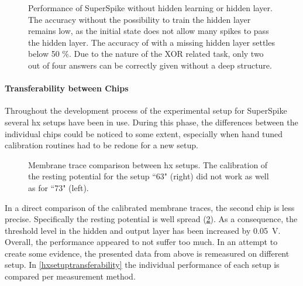 \begin{figure}[htb!]
		\centering
		
	\caption[Performance of SuperSpike without hidden learning or hidden layer.]{Performance of SuperSpike without hidden learning or hidden layer. The accuracy without the possibility to train the hidden layer remains low, as the initial state does not allow many spikes to pass the hidden layer. The accuracy of with a missing hidden layer settles below 50 \%. Due to the nature of the XOR related task, only two out of four answers can be correctly given without a deep structure.}
	\label{hiddenlearning}
\end{figure}

\paragraph{Transferability between Chips}
Throughout the development process of the experimental setup for SuperSpike several \gls{hx} setups have been in use. During this phase, the differences between the individual chips could be noticed to some extent, especially when hand tuned calibration routines had to be redone for a new setup.
\begin{figure}[b!]
	\begin{subfigure}{0.5\textwidth}
		\centering
		
	\end{subfigure}
	\begin{subfigure}{0.5\textwidth}
		\centering
		
	\end{subfigure}
	\caption[Membrane trace comparison between \gls{hx} setups.]{Membrane trace comparison between \gls{hx} setups. The calibration of the resting potential for the setup ``63" (right) did not work as well as for ``73" (left).}
	\label{hxsetupmemtracescomparison}
\end{figure}
In a direct comparison of the calibrated membrane traces, the second chip is less precise. Specifically the resting potential is well spread (\cref{hxsetupmemtracescomparison}). As a consequence, the threshold level in the hidden and output layer has been increased by \SI{0.05}{V}. Overall, the performance appeared to not suffer too much. In an attempt to create some evidence, the presented data from above is remeasured on different setup. In \cref{hxsetuptransferability} the individual performance of each setup is compared per measurement method.

